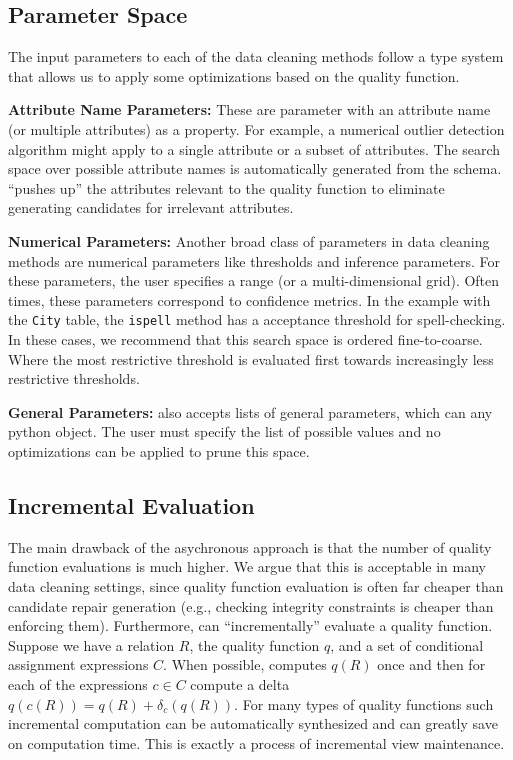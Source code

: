 \subsection{Parameter Space}
The input parameters to each of the data cleaning methods follow a type system that allows us to apply some optimizations based on the quality function.

\noindent \textbf{Attribute Name Parameters: } These are parameter with an attribute name (or multiple attributes) as a property. For example, a numerical outlier detection algorithm might apply to a single attribute or a subset of attributes. The search space over possible attribute names is automatically generated from the schema. \sys ``pushes up'' the attributes relevant to the quality function to eliminate generating candidates for irrelevant attributes. 

\noindent \textbf{Numerical Parameters: } Another broad class of parameters in data cleaning methods are numerical parameters like thresholds and inference parameters. For these parameters, the user specifies a range (or a multi-dimensional grid). Often times, these parameters correspond to confidence metrics. In the example with the \texttt{City} table, the \texttt{ispell} method has a acceptance threshold for spell-checking. In these cases, we recommend that this search space is ordered fine-to-coarse. Where the most restrictive threshold is evaluated first towards increasingly less restrictive thresholds. 

\noindent \textbf{General Parameters: } \sys also accepts lists of general parameters, which can any python object. The user must specify the list of possible values and no optimizations can be applied to prune this space.

\subsection{Incremental Evaluation}
The main drawback of the asychronous approach is that the number of quality function evaluations is much higher. We argue that this is acceptable in many data cleaning settings, since quality function evaluation is often far cheaper than candidate repair generation (e.g., checking integrity constraints is cheaper than enforcing them). Furthermore, \sys can ``incrementally'' evaluate a quality function. 
Suppose we have a relation $R$, the quality function $q$, and a set of conditional assignment expressions $C$.
When possible, \sys computes $q(R)$ once and then for each of the expressions $c \in C$ compute a delta $q(c(R)) = q(R) + \delta_c(q(R))$.
For many types of quality functions such incremental computation can be automatically synthesized and can greatly save on computation time.
This is exactly a process of incremental view maintenance.

